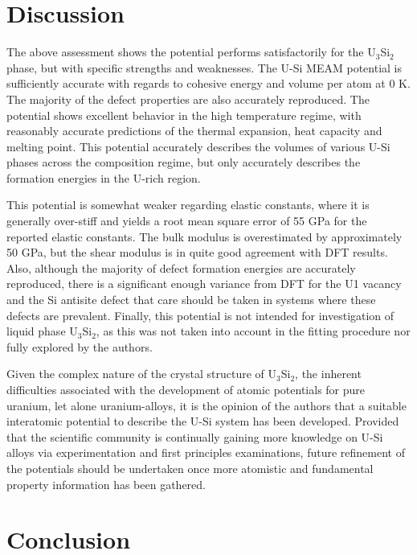 \documentclass[review]{elsarticle}
\begin{document}
\FloatBarrier
\clearpage

\section{Discussion}

The above assessment shows the potential performs satisfactorily for the U$_{3}$Si$_{2}$ phase, but with specific strengths and weaknesses.  The U-Si MEAM potential is sufficiently accurate with regards to cohesive energy and volume per atom at 0 K.  The majority of the defect properties are also accurately reproduced.  The potential shows excellent behavior in the high temperature regime, with reasonably accurate predictions of the thermal expansion, heat capacity and melting point.  This potential accurately describes the volumes of various U-Si phases across the composition regime, but only accurately describes the formation energies in the U-rich region.  

This potential is somewhat weaker regarding elastic constants, where it is generally over-stiff and yields a root mean square error of 55 GPa for the reported elastic constants.  The bulk modulus is overestimated by approximately 50 GPa, but the shear modulus is in quite good agreement with DFT results.  Also, although the majority of defect formation energies are accurately reproduced, there is a significant enough variance from DFT for the U1 vacancy and the Si antisite defect that care should be taken in systems where these defects are prevalent.  Finally, this potential is not intended for investigation of liquid phase U$_{3}$Si$_{2}$, as this was not taken into account in the fitting procedure nor fully explored by the authors.  

Given the complex nature of the crystal structure of U$_{3}$Si$_{2}$, the inherent difficulties associated with the development of atomic potentials for pure uranium, let alone uranium-alloys, it is the opinion of the authors that a suitable interatomic potential to describe the U-Si system has been developed.  Provided that the scientific community is continually gaining more knowledge on U-Si alloys via experimentation and first principles examinations, future refinement of the potentials should be undertaken once more atomistic and fundamental property information has been gathered.  

\section{Conclusion}
\end{document}
